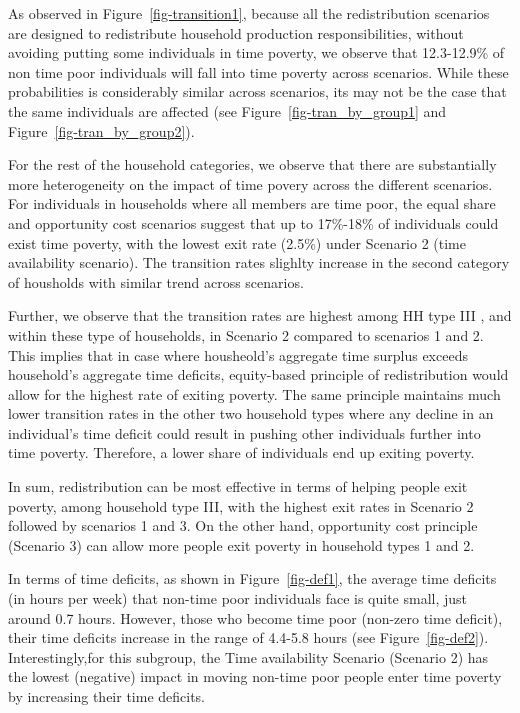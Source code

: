 \documentclass[
  11pt,
]{article}
\begin{document}
As observed in Figure~\ref{fig-transition1}, because all the
redistribution scenarios are designed to redistribute household
production responsibilities, without avoiding putting some individuals
in time poverty, we observe that 12.3-12.9\% of non time poor
individuals will fall into time poverty across scenarios. While these
probabilities is considerably similar across scenarios, its may not be
the case that the same individuals are affected (see
Figure~\ref{fig-tran_by_group1} and Figure~\ref{fig-tran_by_group2}).

For the rest of the household categories, we observe that there are
substantially more heterogeneity on the impact of time povery across the
different scenarios. For individuals in households where all members are
time poor, the equal share and opportunity cost scenarios suggest that
up to 17\%-18\% of individuals could exist time poverty, with the lowest
exit rate (2.5\%) under Scenario 2 (time availability scenario). The
transition rates slighlty increase in the second category of housholds
with similar trend across scenarios.

Further, we observe that the transition rates are highest among HH type
III , and within these type of households, in Scenario 2 compared to
scenarios 1 and 2. This implies that in case where housheold's aggregate
time surplus exceeds household's aggregate time deficits, equity-based
principle of redistribution would allow for the highest rate of exiting
poverty. The same principle maintains much lower transition rates in the
other two household types where any decline in an individual's time
deficit could result in pushing other individuals further into time
poverty. Therefore, a lower share of individuals end up exiting poverty.

In sum, redistribution can be most effective in terms of helping people
exit poverty, among household type III, with the highest exit rates in
Scenario 2 followed by scenarios 1 and 3. On the other hand, opportunity
cost principle (Scenario 3) can allow more people exit poverty in
household types 1 and 2.

In terms of time deficits, as shown in Figure~\ref{fig-def1}, the
average time deficits (in hours per week) that non-time poor individuals
face is quite small, just around 0.7 hours. However, those who become
time poor (non-zero time deficit), their time deficits increase in the
range of 4.4-5.8 hours (see Figure~\ref{fig-def2}). Interestingly,for
this subgroup, the Time availability Scenario (Scenario 2) has the
lowest (negative) impact in moving non-time poor people enter time
poverty by increasing their time deficits.
\end{document}
